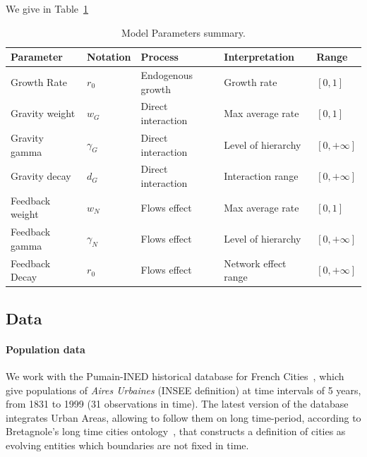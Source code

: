 \documentclass[Royal,sageh,times]{sagej}
\begin{document}
We give in Table~\ref{tab:parameters}



\begin{table}[ht]
\small\sf\centering
\caption{Model Parameters summary.}\label{tab:parameters}
\begin{tabular}{|l|l|l|l|l|}
\toprule
Parameter & Notation & Process & Interpretation & Range\\
\midrule
Growth Rate & $r_0$ & Endogenous growth & Growth rate & $\left[ 0,1\right]$ \\
Gravity weight & $w_G$ & Direct interaction & Max average rate & $\left[ 0,1\right]$ \\
Gravity gamma & $\gamma_G$ & Direct interaction & Level of hierarchy & $\left[ 0,+\infty\right]$ \\
Gravity decay & $d_G$ & Direct interaction & Interaction range & $\left[ 0,+\infty\right]$ \\
Feedback weight & $w_N$ & Flows effect & Max average rate & $\left[ 0,1\right]$ \\
Feedback gamma & $\gamma_N$ & Flows effect & Level of hierarchy & $\left[ 0,+\infty\right]$ \\
Feedback Decay & $r_0$ & Flows effect & Network effect range & $\left[ 0,+\infty\right]$ \\
\bottomrule
\end{tabular}
\end{table}



\subsection*{Data}

\paragraph{Population data}

We work with the Pumain-INED historical database for French Cities~\cite{pumain1986fichier}, which give populations of \emph{Aires Urbaines} (INSEE definition) at time intervals of 5 years, from 1831 to 1999 (31 observations in time). The latest version of the database integrates Urban Areas, allowing to follow them on long time-period, according to Bretagnole's long time cities ontology~\cite{bretagnolle:tel-00459720}, that constructs a definition of cities as evolving entities which boundaries are not fixed in time.
\end{document}
